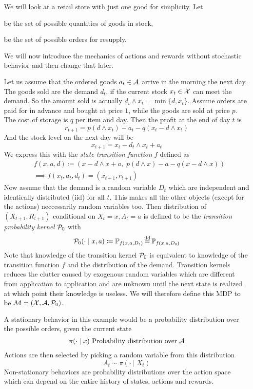 \begin{example}\label{example: inventory mgmt} We will look at a retail store with just one good for simplicity. Let
	\begin{description}[noitemsep]
		\item[\(\cX\coloneqq\N\)] be the set of possible quantities of goods in stock,
		\item[\(\cA\coloneqq\N\)] be the set of possible orders for resupply.
	\end{description}
	We will now introduce the mechanics of actions and rewards without stochastic behavior and then change that later.

	Let us assume that the ordered goods \(a_t\in\mathcal{A}\) arrive in the morning the next day. The goods sold are the demand \(d_t\), if the current stock \(x_t\in\mathcal{X}\) can meet the demand. So the amount sold is actually \(d_t\wedge x_t = \min\{d,x_t\}\). Assume orders are paid for in advance and bought at price \(1\), while the goods are sold at price \(p\). The cost of storage is \(q\) per item and day. Then the profit at the end of day \(t\) is
	\[
		r_{t+1}= p (d\wedge x_t)-a_t-q(x_t - d\wedge x_t)
	\]
	And the stock level on the next day will be
	\[
		x_{t+1}=x_t - d_t\wedge x_t + a_t 
	\]
	We express this with the \emph{state transition function} \(f\) defined as
	\begin{align*}
		&f(x,a,d)\coloneqq \left(x-d\wedge x + a,\; p(d\wedge x) - a - q(x - d\wedge x)\right)\\
		&\implies f(x_t,a_t,d_t)=(x_{t+1}, r_{t+1})
	\end{align*}
	Now assume that the demand is a random variable \(D_t\) which are independent and identically distributed (iid) for all \(t\). This makes all the other objects (except for the actions) neccessarily random variables too. Then distribution of \((X_{t+1},R_{t+1})\) conditional on \(X_t=x, A_t=a\) is defined to be the \emph{transition probability kernel} \(\mathcal{P}_0\) with
	\begin{align*}
		\cP_0(\cdot \mid x, a)\coloneqq\Pr_{f(x,a,D_t)}\xeq{\text{iid}} \Pr_{f(x,a,D_0)}
	\end{align*}
	Note that knowledge of the transition kernel \(\mathcal{P}_0\) is equivalent to knowledge of the transition function \(f\) and the distribution of the demand. Transition kernels reduces the clutter caused by exogenous random variables which are different from application to application and are unknown until the next state is realized at which point their knowledge is useless. We will therefore define this MDP to be \(\mathcal{M}=(\mathcal{X},\mathcal{A},\mathcal{P}_0)\).

	A stationary behavior in this example would be a probability distribution over the possible orders, given the current state
	\begin{align*}
		\pi(\cdot \mid x) \text{ Probability distribution over }\mathcal{A}
	\end{align*}
	Actions are then selected by picking a random variable from this distribution
	\[
		A_t \sim \pi(\cdot \mid X_t)
	\]
	Non-stationary behaviors are probability distributions over the action space which can depend on the entire history of states, actions and rewards. 
\end{example}

